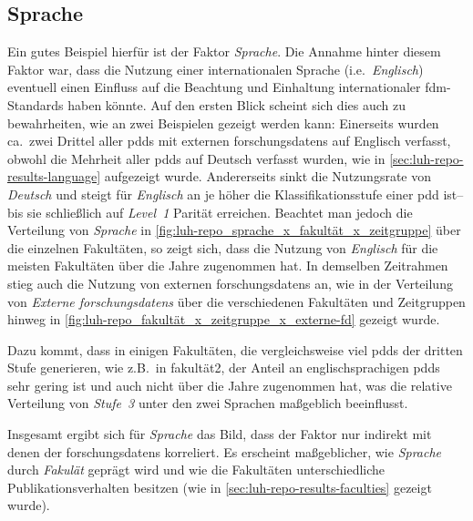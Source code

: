 \subsection{Sprache}
Ein gutes Beispiel hierfür ist der Faktor \textit{Sprache}.
Die Annahme hinter diesem Faktor war, dass die Nutzung einer internationalen Sprache (i.e.~\textit{Englisch}) eventuell einen Einfluss auf die Beachtung und Einhaltung internationaler \gls{fdm}-Standards haben könnte.
Auf den ersten Blick scheint sich dies auch zu bewahrheiten, wie an zwei Beispielen gezeigt werden kann: 
Einerseits wurden ca.~zwei Drittel aller \glspl{pdd} mit externen \glspl{forschungsdaten} auf Englisch verfasst, obwohl die Mehrheit aller \glspl{pdd} auf Deutsch verfasst wurden, wie in \cref{sec:luh-repo-results-language} aufgezeigt wurde.
Andererseits sinkt die Nutzungsrate von \textit{Deutsch} und steigt für \textit{Englisch} an je höher die Klassifikationsstufe einer \gls{pdd} ist--bis sie schließlich auf \textit{Level~1} Parität erreichen.
Beachtet man jedoch die Verteilung von \textit{Sprache} in \cref{fig:luh-repo_sprache_x_fakultät_x_zeitgruppe} über die einzelnen Fakultäten, so zeigt sich, dass die Nutzung von \textit{Englisch} für die meisten Fakultäten über die Jahre zugenommen hat.
In demselben Zeitrahmen stieg auch die Nutzung von externen \glspl{forschungsdaten} an, wie in der Verteilung von \textit{Externe \glspl{forschungsdaten}} über die verschiedenen Fakultäten und Zeitgruppen hinweg in \cref{fig:luh-repo_fakultät_x_zeitgruppe_x_externe-fd} gezeigt wurde.

Dazu kommt, dass in einigen Fakultäten, die vergleichsweise viel \glspl{pdd} der dritten Stufe generieren, wie z.B.~in \gls{fakultät2}, der Anteil an englischsprachigen \glspl{pdd} sehr gering ist und auch nicht über die Jahre zugenommen hat, was die relative Verteilung von \textit{Stufe~3} unter den zwei Sprachen maßgeblich beeinflusst.

Insgesamt ergibt sich für \textit{Sprache} das Bild, dass der Faktor nur indirekt mit denen der \glspl{forschungsdaten} korreliert.
Es erscheint maßgeblicher, wie \textit{Sprache} durch \textit{Fakulät} geprägt wird und wie die Fakultäten unterschiedliche Publikationsverhalten besitzen (wie in \cref{sec:luh-repo-results-faculties} gezeigt wurde).

